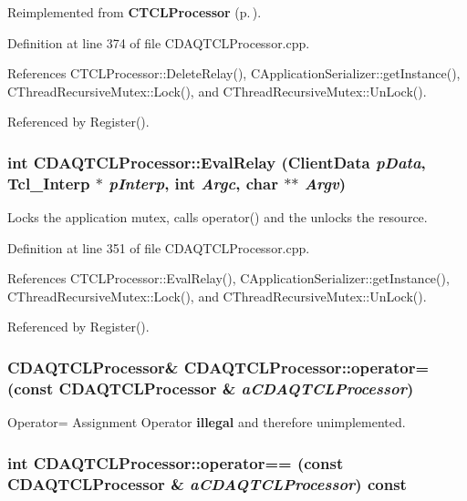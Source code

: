 Reimplemented from {\bf CTCLProcessor} {\rm (p.\,\pageref{classCTCLProcessor_d2})}.

Definition at line 374 of file CDAQTCLProcessor.cpp.

References CTCLProcessor::Delete\-Relay(), CApplication\-Serializer::get\-Instance(), CThread\-Recursive\-Mutex::Lock(), and CThread\-Recursive\-Mutex::Un\-Lock().

Referenced by Register().
\subsubsection{\setlength{\rightskip}{0pt plus 5cm}int CDAQTCLProcessor::Eval\-Relay (Client\-Data {\em p\-Data}, Tcl\_\-Interp $\ast$ {\em p\-Interp}, int {\em Argc}, char $\ast$$\ast$ {\em Argv})\hspace{0.3cm}{\tt  [static, private]}}\label{classCDAQTCLProcessor_f0}


Locks the application mutex, calls operator() and the unlocks the resource. 

Definition at line 351 of file CDAQTCLProcessor.cpp.

References CTCLProcessor::Eval\-Relay(), CApplication\-Serializer::get\-Instance(), CThread\-Recursive\-Mutex::Lock(), and CThread\-Recursive\-Mutex::Un\-Lock().

Referenced by Register().
\subsubsection{\setlength{\rightskip}{0pt plus 5cm}CDAQTCLProcessor\& CDAQTCLProcessor::operator= (const CDAQTCLProcessor \& {\em a\-CDAQTCLProcessor})\hspace{0.3cm}{\tt  [private]}}\label{classCDAQTCLProcessor_c1}


Operator= Assignment Operator {\bf illegal} and therefore unimplemented.

\subsubsection{\setlength{\rightskip}{0pt plus 5cm}int CDAQTCLProcessor::operator== (const CDAQTCLProcessor \& {\em a\-CDAQTCLProcessor}) const\hspace{0.3cm}{\tt  [inline]}}\label{classCDAQTCLProcessor_a3}


